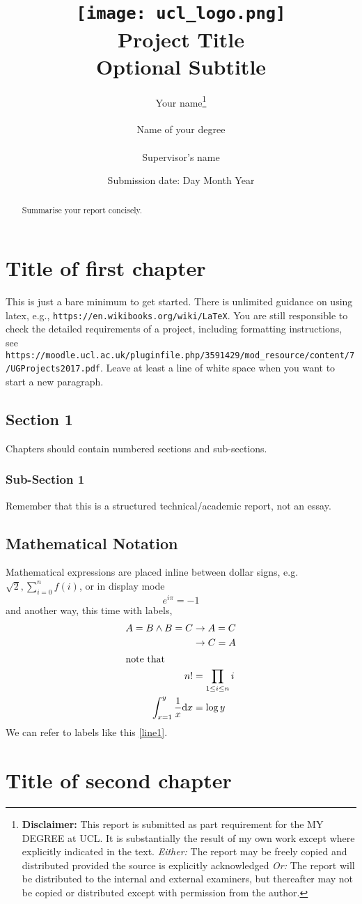 \documentclass[a4paper]{report}
\title{{\vspace{-14em} \texttt{[image: ucl\_logo.png]}}\\
{{\Huge Project Title}}\\
{\large Optional Subtitle}\\
}
\date{Submission date: Day Month Year}
\author{Your name\thanks{
{\bf Disclaimer:}
This report is submitted as part requirement for the MY DEGREE at UCL. It is
substantially the result of my own work except where explicitly indicated in the text.
\emph{Either:} The report may be freely copied and distributed provided the source is explicitly acknowledged
\newline  %
\emph{Or:}\newline
The report will be distributed to the internal and external examiners, but thereafter may not be copied or distributed except with permission from the author.}
\\ \\
Name of your degree\\ \\
Supervisor's name}
\begin{document}
 
\onehalfspacing
\maketitle
\begin{abstract}
Summarise your report concisely.
\end{abstract}
\tableofcontents
\setcounter{page}{1}


\chapter{Title of first chapter}
This is just a bare minimum to get started.  There is unlimited guidance on using latex, e.g., {\tt https://en.wikibooks.org/wiki/LaTeX}.   You are still responsible to check the detailed requirements of a project, including formatting instructions, see \\
{\tt https://moodle.ucl.ac.uk/pluginfile.php/3591429/mod\_resource/content/7/UGProjects2017.pdf}.
Leave at least a line of white space when you want to start a new paragraph.

\section{Section 1}
Chapters should contain numbered sections and sub-sections.

\subsection{Sub-Section 1}
Remember that this is a structured technical/academic report, not an essay.

\section{Mathematical Notation}
Mathematical expressions are placed inline between dollar signs, e.g. $\sqrt 2, \sum_{i=0}^nf(i)$, or in display mode
\[ e^{i\pi}=-1\] and another way, this time with labels,
\begin{align}
\label{line1} A=B\wedge B=C&\rightarrow A=C\\
&\rightarrow C=A\\
\intertext{note that}
n!&=\prod_{1\leq i\leq n}i \\
\int_{x=1}^y \frac 1 x \mathrm{d}x&=\log y
\end{align}
We can refer to labels like this \eqref{line1}.   

\chapter{Title of second chapter}
\end{document}
